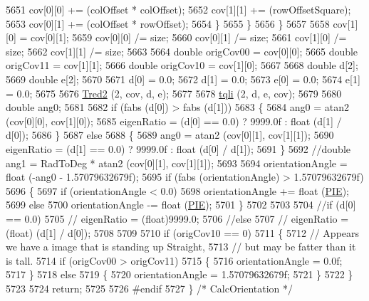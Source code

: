 \begin{DoxyCode}
5651         cov[0][0] += (colOffset * colOffset);
5652         cov[1][1] += (rowOffsetSquare);
5653         cov[0][1] += (colOffset * rowOffset);
5654       \}
5655     \}
5656   \}
5657 
5658   cov[1][0] = cov[0][1];
5659   cov[0][0] /= size;
5660   cov[0][1] /= size;
5661   cov[1][0] /= size;
5662   cov[1][1] /= size;
5663 
5664   \textcolor{keywordtype}{double}  origCov00 = cov[0][0];
5665   \textcolor{keywordtype}{double}  origCov11 = cov[1][1];
5666   \textcolor{keywordtype}{double}  origCov10 = cov[1][0];
5667 
5668   \textcolor{keywordtype}{double}  d[2];
5669   \textcolor{keywordtype}{double}  e[2];
5670 
5671   d[0] = 0.0;
5672   d[1] = 0.0;
5673   e[0] = 0.0;
5674   e[1] = 0.0;
5675 
5676   \hyperlink{namespace_k_k_b_a2a2800ef0c9757025d696bcd2fb289b8}{Tred2} (2, cov, d, e);
5677 
5678   \hyperlink{namespace_k_k_b_af61d1354a68af3f797ed471b1cc3ff8f}{tqli} (2, d, e, cov);
5679 
5680   \textcolor{keywordtype}{double}  ang0;
5681 
5682   \textcolor{keywordflow}{if}  (fabs (d[0]) > fabs (d[1]))
5683   \{
5684     ang0 = atan2 (cov[0][0], cov[1][0]);
5685     eigenRatio = (d[0] == 0.0) ? 9999.0f : float (d[1] / d[0]);
5686   \}
5687   \textcolor{keywordflow}{else}
5688   \{
5689     ang0 = atan2 (cov[0][1], cov[1][1]);
5690     eigenRatio = (d[1] == 0.0) ? 9999.0f : float (d[0] / d[1]);
5691   \}
5692   \textcolor{comment}{//double  ang1 = RadToDeg * atan2 (cov[0][1], cov[1][1]);}
5693 
5694   orientationAngle = float (-ang0 - 1.57079632679f);
5695   \textcolor{keywordflow}{if}  (fabs (orientationAngle) > 1.57079632679f)
5696   \{
5697     \textcolor{keywordflow}{if}  (orientationAngle < 0.0)
5698       orientationAngle += float (\hyperlink{_k_k_base_types_8h_ac40c2b49eb51e2adc237b530adfcadf4}{PIE});
5699     \textcolor{keywordflow}{else}
5700       orientationAngle -= float (\hyperlink{_k_k_base_types_8h_ac40c2b49eb51e2adc237b530adfcadf4}{PIE});
5701   \}
5702 
5703 
5704   \textcolor{comment}{//if  (d[0] == 0.0)}
5705   \textcolor{comment}{//  eigenRatio = (float)9999.0;}
5706   \textcolor{comment}{//else}
5707   \textcolor{comment}{//  eigenRatio = (float) (d[1] / d[0]);}
5708 
5709 
5710   \textcolor{keywordflow}{if}  (origCov10 == 0)
5711   \{
5712     \textcolor{comment}{// Appears we have a image that is standing up Straight, }
5713     \textcolor{comment}{// but may be fatter than it is tall.}
5714     \textcolor{keywordflow}{if}  (origCov00 > origCov11)
5715     \{
5716       orientationAngle = 0.0f;
5717     \}
5718     \textcolor{keywordflow}{else}
5719     \{
5720       orientationAngle = 1.57079632679f;
5721     \}
5722   \}
5723 
5724   \textcolor{keywordflow}{return};
5725 
5726 \textcolor{preprocessor}{#endif}
5727 \} \textcolor{comment}{/* CalcOrientation */}
\end{DoxyCode}
